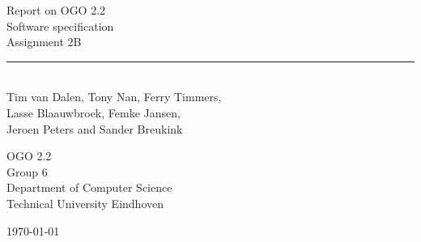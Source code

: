 \begin{titlepage}
	\begin{center}
		
		{\Huge Report on OGO 2.2\\ Software specification}\\[0.5cm]
		{\huge Assignment 2B}\\
		\rule{\linewidth}{0.5mm}\\[0.5cm]
		
		
		{\Large
		Tim van Dalen, Tony Nan, Ferry Timmers,\\ 
		Lasse Blaauwbroek, Femke Jansen,\\
		Jeroen Peters and Sander Breukink\\[1cm]
		}
		
		{\large
		OGO 2.2\\
		Group 6 \\[1cm]
		Department of Computer Science\\
		Technical University Eindhoven\\[1cm]
		}
		
		

		\vfill

		{\large \today}
	\end{center}
\end{titlepage}
